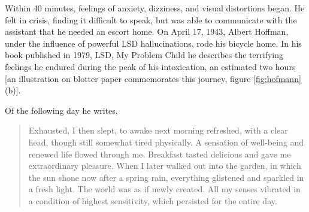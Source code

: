 \documentclass{UIdahoMastersThesis}
\begin{document}
Within 40 minutes, feelings of anxiety, dizziness, and visual distortions began. He felt in crisis, finding it difficult to speak, but was able to communicate with the assistant that he needed an escort home. On April 17, 1943, Albert Hoffman, under the influence of powerful LSD hallucinations, rode his bicycle home. In his book published in 1979, LSD, My Problem Child he describes the terrifying feelings he endured during the peak of his intoxication, an estimated two hours [an illustration on blotter paper commemorates this journey, figure \ref{fig:hofmann}(b)].

Of the following day he writes, 


\begin{quote}
{Exhausted, I then slept, to awake next morning refreshed, with a clear head, though still somewhat tired physically. A sensation of well-being and renewed life flowed through me. Breakfast tasted delicious and gave me extraordinary pleasure. When I later walked out into the garden, in which the sun shone now after a spring rain, everything glistened and sparkled in a fresh light. The world was as if newly created. All my senses vibrated in a condition of highest sensitivity, which persisted for the entire day.}\cite{hofmann_lsd:_1980}
\end{quote}
\end{document}
